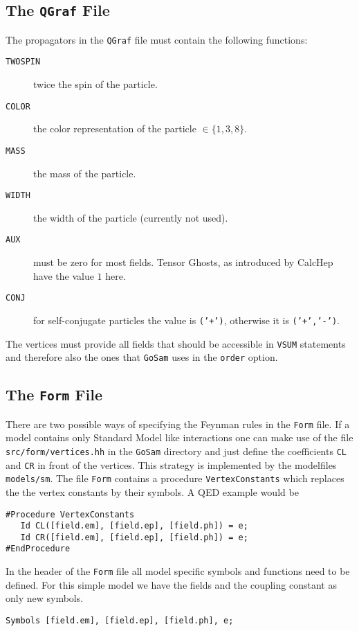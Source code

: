 \documentclass[11pt,a4paper]{refrep}
\newcommand{\golemversion}{{1{.}0}}
\newcommand{\golemv}[1][\golemversion]{{\tt GoSam}\xspace}
\newcommand{\qgraf}{{\tt QGraf}\xspace}
\newcommand{\form}{{\tt Form}\xspace}
\begin{document}
\subsection{The \qgraf{} File}
The propagators in the \qgraf{} file must contain the following functions:
\begin{description}
\item[\texttt{TWOSPIN}] twice the spin of the particle.
\item[\texttt{COLOR}]   the color representation of the particle $\in\{1,3,8\}$.
\item[\texttt{MASS}]    the mass of the particle.
\item[\texttt{WIDTH}]   the width of the particle (currently not used).
\item[\texttt{AUX}]     must be zero for most fields. Tensor Ghosts, as introduced
                        by CalcHep have the value $1$ here.
\item[\texttt{CONJ}]    for self-conjugate particles the value is \texttt{('+')},
                        otherwise it is \texttt{('+','-')}.
\end{description}

The vertices must provide all fields that should be accessible in \texttt{VSUM} statements
and therefore also the ones that \golemv{} uses in the \texttt{order} option.

\subsection{The \form{} File}
There are two possible ways of specifying the Feynman rules in the \form{} file.
If a model contains only Standard Model like interactions one can make use of
the file \texttt{src/form/vertices.hh} in the \golemv{} directory and just define
the coefficients \texttt{CL} and \texttt{CR} in front of the vertices. This
strategy is implemented by the modelfiles \texttt{models/sm}. The file
\form{} contains a procedure \texttt{VertexConstants} which
replaces the the vertex constants by their symbols. A QED example would be
\begin{lstlisting}[language=form]
#Procedure VertexConstants
   Id CL([field.em], [field.ep], [field.ph]) = e;
   Id CR([field.em], [field.ep], [field.ph]) = e;
#EndProcedure
\end{lstlisting}
In the header of the \form{} file all model specific
symbols and functions need to be defined. For this simple
model we have the fields and the coupling constant as only
new symbols.
\begin{lstlisting}[language=form]
Symbols [field.em], [field.ep], [field.ph], e;
\end{lstlisting}
\end{document}
